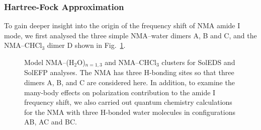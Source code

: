\documentclass[b5paper,oneside,fleqn,11pt]{book}
\begin{document}
\begin{refsection}
\subsubsection{Hartree-Fock Approximation}

To gain deeper insight into the origin of the frequency
shift of NMA amide I mode, we first analysed the three simple
NMA--water dimers A, B and C, and the NMA--CHCl$_3$ dimer D 
shown in Fig.~\ref{f:nma-abcde}. 
%
\begin{figure}[t!]
\centering
\setlength\fboxsep{0.4pt}
\setlength\fboxrule{0.5pt}
\caption{
Model NMA--(H$_2$O)$_{n = 1,3}$ and NMA--CHCl$_3$ clusters 
for SolEDS and SolEFP analyses. The NMA has three H-bonding sites so that three dimers A, B, and C are
considered here. In addition, to examine the many\hyp{}body effects on polarization contribution 
to the amide I frequency shift, we also carried out quantum
chemistry calculations for the NMA with three H-bonded water molecules in configurations
AB, AC and BC.
\label{f:nma-abcde}}
\end{figure}
%


\end{refsection}
\end{document}
